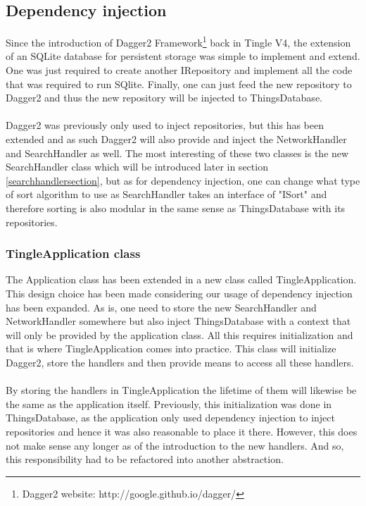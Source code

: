 \documentclass{article}
\begin{document}
\subsection{Dependency injection} \label{DISection}

Since the introduction of Dagger2  Framework\footnote{Dagger2 website: http://google.github.io/dagger/}  back in Tingle V4, the extension of an SQLite database for persistent storage was simple to implement and extend. One was just required to create another IRepository and implement all the code that was required to run SQlite. Finally, one can just feed the new repository to Dagger2 and thus the new repository will be injected to ThingsDatabase. \\\\Dagger2 was previously only used to inject repositories, but this has been extended and as such Dagger2 will also provide and inject the NetworkHandler and SearchHandler  as well. The most interesting of these two classes is the new SearchHandler class which will be introduced later in section \ref{searchhandlersection}, but as for dependency injection, one can change what type of sort algorithm to use as SearchHandler takes an interface of "ISort" and therefore sorting is also modular in the same sense as ThingsDatabase with its repositories.
\pagebreak

\subsubsection{TingleApplication class}
The Application class has been extended in a new class called TingleApplication. This design choice has been made considering our usage of dependency injection has been expanded. As is, one need to store the new SearchHandler and NetworkHandler somewhere but also inject ThingsDatabase with a context that will only be provided by the application class. All this requires initialization and that is where TingleApplication comes into practice. This class will initialize Dagger2, store the handlers and then provide means to access all these handlers.\\\\By storing the handlers in TingleApplication the lifetime of them will likewise be the same as the application itself. Previously, this initialization was done in ThingsDatabase, as the application only used dependency injection to inject repositories and hence it was also reasonable to place it there. However, this does not make sense any longer as of the introduction to the new handlers. 
And so, this responsibility had to be refactored into another abstraction. 
\end{document}
